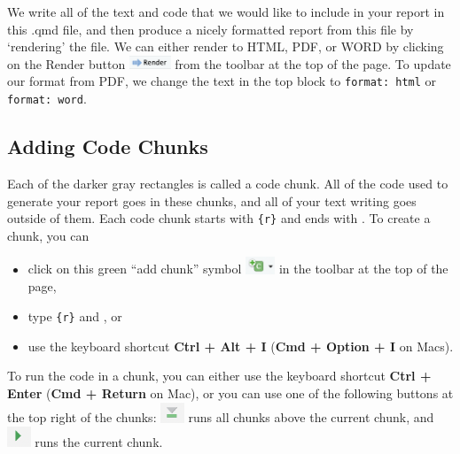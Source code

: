 \documentclass[
  letterpaper,
]{latex/krantz}
\begin{document}
We write all of the text and code that we would like to include in your
report in this .qmd file, and then produce a nicely formatted report
from this file by `rendering' the file. We can
either render to HTML, PDF, or WORD by clicking on the Render button
\includegraphics[width=0.48611in,height=\textheight]{book/images/quarto_reports/render-icon.png}
from the toolbar at the top of the page. To update our format from PDF,
we change the text in the top block to \texttt{format:\ html} or
\texttt{format:\ word}.

\subsection{\texorpdfstring{Adding Code Chunks
}{Adding Code Chunks }}\label{adding-code-chunks}

Each of the darker gray rectangles is called a code chunk. All of the
code used to generate your report goes in these chunks, and all of your
text writing goes outside of them. Each code chunk starts with
\texttt{\textasciigrave{}\textasciigrave{}\textasciigrave{}\{r\}} and
ends with \texttt{\textasciigrave{}\textasciigrave{}\textasciigrave{}}.
To create a chunk, you can

\begin{itemize}
\item
  click on this green ``add chunk'' symbol
  \includegraphics[width=0.34722in,height=\textheight]{book/images/quarto_reports/add-chunk.png}
  in the toolbar at the top of the page,
\item
  type \texttt{\textasciigrave{}\textasciigrave{}\textasciigrave{}\{r\}}
  and \texttt{\textasciigrave{}\textasciigrave{}\textasciigrave{}}, or
\item
  use the keyboard shortcut \textbf{Ctrl + Alt + I} (\textbf{Cmd +
  Option + I} on Macs).
\end{itemize}

To run the code in a chunk, you can either use the keyboard shortcut
\textbf{Ctrl + Enter} (\textbf{Cmd + Return} on Mac), or you can use one
of the following buttons at the top right of the chunks:
\includegraphics[width=0.27778in,height=\textheight]{book/images/quarto_reports/run-all-chunks-above.png}
runs all chunks above the current chunk, and
\includegraphics[width=0.27778in,height=\textheight]{book/images/quarto_reports/run-current-chunk.png}
runs the current chunk.
\end{document}
